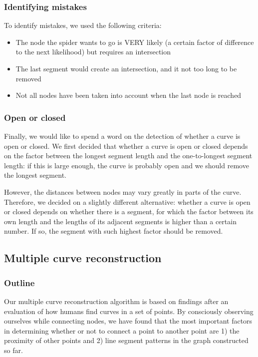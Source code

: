 \documentclass[11pt]{article}
\begin{document}
\subsubsection{Identifying mistakes} 

To identify mistakes, we used the following criteria:
\begin{itemize}
\item The node the spider wants to go is VERY likely (a certain factor of difference to the next likelihood) but requires an intersection
\item The last segment would create an intersection, and it not too long to be removed
\item Not all nodes have been taken into account when the last node is reached
\end{itemize}


\subsubsection{Open or closed} 

Finally, we would like to spend a word on the detection of whether a curve is open or closed. We first decided that whether a curve is open or closed depends on the factor between the longest segment length and the one-to-longest segment length: if this is large enough, the curve is probably open and we should remove the longest segment.

However, the distances between nodes may vary greatly in parts of the curve. Therefore, we decided on a slightly different alternative: whether a curve is open or closed depends on whether there is a segment, for which the factor between its own length and the lengths of its adjacent segments is higher than a certain number. If so, the segment with such highest factor should be removed.

\subsection{Multiple curve reconstruction}

\subsubsection{Outline}
Our multiple curve reconstruction algorithm is based on findings after an evaluation of how humans find curves in a set of points. By consciously observing ourselves while connecting nodes, we have found that the most important factors in determining whether or not to connect a point to another point are 1) the proximity of other points and 2) line segment patterns in the graph constructed so far.
\end{document}

